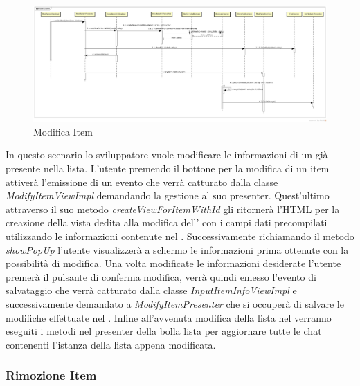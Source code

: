 \label{Modifica Item}
\begin{figure}[H]
	\centering
	\includegraphics[width=\textwidth]{Sezioni/Diagrammi/img_app/modifica_item.jpg}
	\caption{Modifica Item}
\end{figure}

In questo scenario lo sviluppatore vuole modificare le informazioni di un  già presente nella lista. L'utente premendo il bottone per la modifica di un item attiverà l'emissione di un evento che verrà catturato dalla classe \textit{ModifyItemViewImpl} demandando la gestione al suo presenter. Quest'ultimo attraverso il suo metodo \textit{createViewForItemWithId} gli ritornerà l'HTML per la creazione della vista dedita alla modifica dell' con i campi dati precompilati utilizzando le informazioni contenute nel . Successivamente richiamando il metodo \textit{showPopUp} l'utente visualizzerà a schermo le informazioni prima ottenute con la possibilità di modifica. Una volta modificate le informazioni desiderate l'utente premerà il pulsante di conferma modifica, verrà quindi emesso l'evento di salvataggio che verrà catturato dalla classe \textit{InputItemInfoViewImpl} e successivamente demandato a \textit{ModifyItemPresenter} che si occuperà di salvare le modifiche effettuate nel . Infine all'avvenuta modifica della lista nel  verranno eseguiti i metodi nel presenter della bolla lista per aggiornare tutte le chat contenenti l'istanza della lista appena modificata. 

\subsubsection{Rimozione Item}

